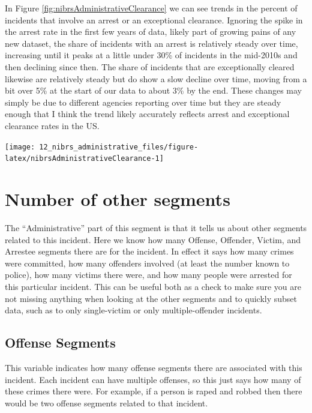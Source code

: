 \documentclass[
]{krantz}
\let\origfigure\figure
\let\endorigfigure\endfigure
\renewenvironment{figure}[1][2] {
    \expandafter\origfigure\expandafter[H]
} {
    \endorigfigure
}
\begin{document}
In Figure \ref{fig:nibrsAdministrativeClearance} we can see
trends in the percent of incidents that involve an arrest or
an exceptional clearance. Ignoring the spike in the arrest
rate in the first few years of data, likely part of growing
pains of any new dataset, the share of incidents with an
arrest is relatively steady over time, increasing until it
peaks at a little under 30\% of incidents in the mid-2010s
and then declining since then. The share of incidents that
are exceptionally cleared likewise are relatively steady but
do show a slow decline over time, moving from a bit over 5\%
at the start of our data to about 3\% by the end. These
changes may simply be due to different agencies reporting
over time but they are steady enough that I think the trend
likely accurately reflects arrest and exceptional clearance
rates in the US.

\begin{figure}

{\centering \texttt{[image: 12\_nibrs\_administrative\_files/figure-latex/nibrsAdministrativeClearance-1]} 

}

\caption{Percent of incidents with an arrest or exceptional clearance, 1991-2022.}\label{fig:nibrsAdministrativeClearance}
\end{figure}

\section{Number of other
segments}\label{number-of-other-segments}

The ``Administrative'' part of this segment is that it tells
us about other segments related to this incident. Here we
know how many Offense, Offender, Victim, and Arrestee
segments there are for the incident. In effect it says how
many crimes were committed, how many offenders involved (at
least the number known to police), how many victims there
were, and how many people were arrested for this particular
incident. This can be useful both as a check to make sure
you are not missing anything when looking at the other
segments and to quickly subset data, such as to only
single-victim or only multiple-offender incidents.

\subsection{Offense Segments}\label{offense-segments}

This variable indicates how many offense segments there are
associated with this incident. Each incident can have
multiple offenses, so this just says how many of these
crimes there were. For example, if a person is raped and
robbed then there would be two offense segments related to
that incident.
\end{document}
